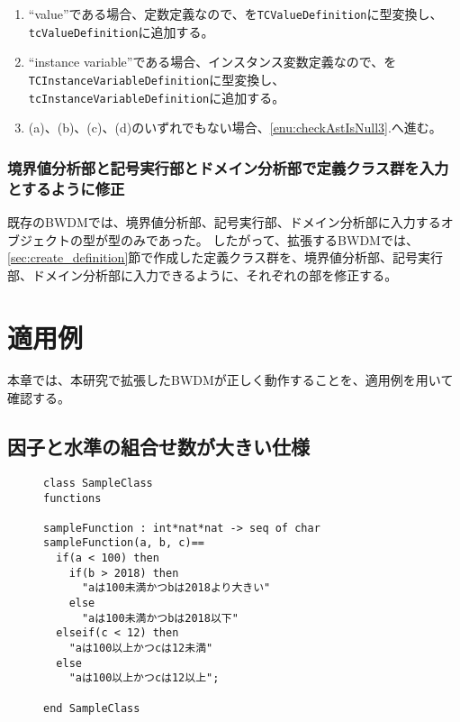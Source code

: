 \documentclass[uplatex, report, a4j, 10pt]{jsbook}
\newcommand\ttt[1]{\texttt{#1}}
\begin{document}
\begin{enumerate}
\begin{enumerate}
\begin{enumerate}
                \end{enumerate}
          \item ``value''である場合、定数定義なので、\astDefinition{}を\ttt{TCValueDefinition}に型変換し、\ttt{tcValueDefinition}に追加する。
          \item ``instance variable''である場合、インスタンス変数定義なので、\astDefinition{}を\ttt{TCInstanceVariableDefinition}に型変換し、\ttt{tcInstanceVariableDefinition}に追加する。
          \item (a)、(b)、(c)、(d)のいずれでもない場合、\ref{enu:checkAstIsNull3}.へ進む。
        \end{enumerate}
\end{enumerate}

\begin{comment}
\begin{figure}[tp]
  \centering
  \texttt{[image: figs/ExtendedAstAnalysis]}
  \caption{拡張したBWDMの抽象構文木解析処理}
  \label{fig:ExtendedAstAnalysis}
\end{figure}
\end{comment}

\subsection{境界値分析部と記号実行部とドメイン分析部で定義クラス群を入力とするように修正}
既存のBWDMでは、境界値分析部、記号実行部、ドメイン分析部に入力するオブジェクトの型が\TCExplicitFunctionDefinition{}型のみであった。
したがって、拡張するBWDMでは、\ref{sec:create_definition}節で作成した定義クラス群を、境界値分析部、記号実行部、ドメイン分析部に入力できるように、それぞれの部を修正する。

\chapter{適用例}\label{cha:Indication}
本章では、本研究で拡張したBWDMが正しく動作することを、適用例を用いて確認する。


\section{因子と水準の組合せ数が大きい仕様}

\lstset{language=}
\begin{figure}[tp]
  \begin{lstlisting}[caption={因子が3で水準が(6, 6, 6)の関数を持つVDM++仕様},label=fig:pict4javaSampleVdm]
class SampleClass
functions

sampleFunction : int*nat*nat -> seq of char
sampleFunction(a, b, c)==
  if(a < 100) then
    if(b > 2018) then
      "aは100未満かつbは2018より大きい"
    else
      "aは100未満かつbは2018以下"
  elseif(c < 12) then
    "aは100以上かつcは12未満"
  else
    "aは100以上かつcは12以上";

end SampleClass
\end{lstlisting}
\end{figure}
\end{document}
